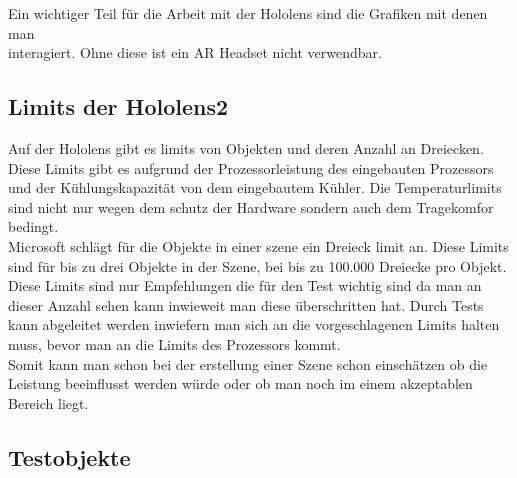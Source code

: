 Ein wichtiger Teil für die Arbeit mit der Hololens sind die Grafiken mit denen man \\ interagiert. Ohne diese ist ein AR Headset nicht verwendbar.\\
\subsection{Limits der Hololens2}\label{subsec:Limits der Hololens2}

Auf der Hololens gibt es limits von Objekten und deren Anzahl an Dreiecken.
Diese Limits gibt es aufgrund der Prozessorleistung des eingebauten Prozessors und der Kühlungskapazität von dem eingebautem Kühler.
Die Temperaturlimits sind nicht nur wegen dem schutz der Hardware sondern auch dem Tragekomfor bedingt.\\
Microsoft schlägt für die Objekte in einer szene ein Dreieck limit an. Diese Limits sind für bis zu drei Objekte in der Szene, bei bis zu 100.000\autocite{optimize_3d} Dreiecke pro Objekt.\\
Diese Limits sind nur Empfehlungen die für den Test wichtig sind da man an dieser Anzahl sehen kann inwieweit man diese überschritten hat.
Durch Tests kann abgeleitet werden inwiefern man sich an die vorgeschlagenen Limits halten muss, bevor man an die Limits des Prozessors kommt.\\
Somit kann man schon bei der erstellung einer Szene schon einschätzen ob die Leistung beeinflusst werden würde oder ob man noch im einem akzeptablen Bereich liegt.



    \newpage

\subsection{Testobjekte}\label{subsec:Testobjekte}


